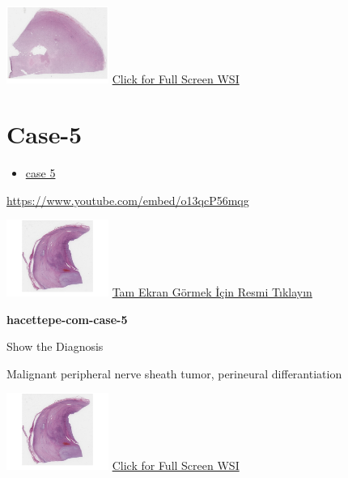 \documentclass[
  letterpaper,
  paper=6in:9in,
  pagesize=pdftex,
  headinclude=on,
  footinclude=on,
  12pt]{scrbook}
\providecommand{\tightlist}{%
  \setlength{\itemsep}{0pt}\setlength{\parskip}{0pt}}\usepackage{longtable,booktabs,array}
\begin{document}
\href{https://images.patolojiatlasi.com/hacettepe-com-case-4/HE2.html}{\includegraphics[width=0.25\textwidth,height=\textheight]{./screenshots/hacettepe-com-case-4-2_screenshot.png}}
\href{https://images.patolojiatlasi.com/hacettepe-com-case-4/HE2.html}{Click
for Full Screen WSI}

\hypertarget{sec-hacettepe-case-of-the-month-case-5}{%
\section{Case-5}\label{sec-hacettepe-case-of-the-month-case-5}}

\begin{itemize}
\tightlist
\item
  \href{https://www.youtube.com/watch?v=o13qcP56mqg\&ab_channel=KemalKosemehmetoglu}{case
  5}
\end{itemize}

\url{https://www.youtube.com/embed/o13qcP56mqg}

\href{https://images.patolojiatlasi.com/hacettepe-com-case-5/HE.html}{\includegraphics[width=0.25\textwidth,height=\textheight]{./screenshots/hacettepe-com-case-5_screenshot.png}}
\href{https://images.patolojiatlasi.com/hacettepe-com-case-5/HE.html}{Tam
Ekran Görmek İçin Resmi Tıklayın}

\textbf{hacettepe-com-case-5}

Show the Diagnosis

\hypertarget{answer5}{}
Malignant peripheral nerve sheath tumor, perineural differantiation

\href{https://images.patolojiatlasi.com/hacettepe-com-case-5/HE.html}{\includegraphics[width=0.25\textwidth,height=\textheight]{./screenshots/hacettepe-com-case-5_screenshot.png}}
\href{https://images.patolojiatlasi.com/hacettepe-com-case-5/HE.html}{Click
for Full Screen WSI}
\end{document}
